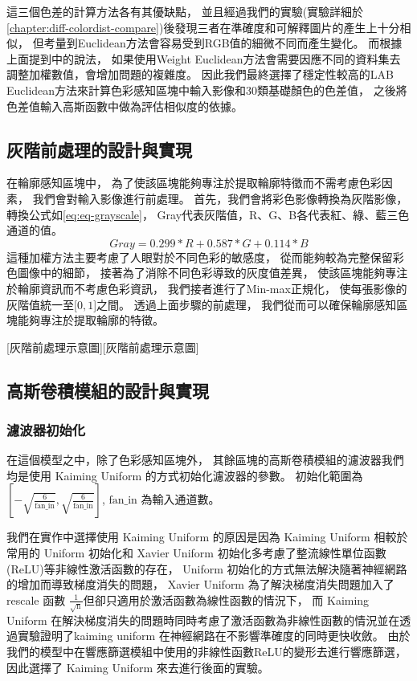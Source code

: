 \documentclass[class=NCU_thesis, crop=false]{standalone}
\begin{document}
			這三個色差的計算方法各有其優缺點，
			並且經過我們的實驗(實驗詳細於\cref{chapter:diff-colordist-compare})後發現三者在準確度和可解釋圖片的產生上十分相似，
			但考量到Euclidean方法會容易受到RGB值的細微不同而產生變化。
			而根據上面提到\cite{LABformula}中的說法，
			如果使用Weight Euclidean方法會需要因應不同的資料集去調整加權數值，會增加問題的複雜度。
			因此我們最終選擇了穩定性較高的LAB Euclidean方法來計算色彩感知區塊中輸入影像和30類基礎顏色的色差值，
			之後將色差值輸入高斯函數中做為評估相似度的依據。

	\subsection{灰階前處理的設計與實現}
		在輪廓感知區塊中，
		為了使該區塊能夠專注於提取輪廓特徵而不需考慮色彩因素，
		我們會對輸入影像進行前處理。
		首先，我們會將彩色影像轉換為灰階影像，
		轉換公式如\cref{eq:eq-grayscale}，
		Gray代表灰階值，R、G、B各代表紅、綠、藍三色通道的值。
		\begin{equation}
		    \label{eq:eq-grayscale}
		    Gray = 0.299 * R + 0.587 * G + 0.114 * B
		\end{equation}
		這種加權方法主要考慮了人眼對於不同色彩的敏感度，
		從而能夠較為完整保留彩色圖像中的細節，
		接著為了消除不同色彩導致的灰度值差異，
		使該區塊能夠專注於輪廓資訊而不考慮色彩資訊，
		我們接者進行了Min-max正規化，
		使每張影像的灰階值統一至[$0, 1$]之間。
		透過上面步驟的前處理，
		我們從而可以確保輪廓感知區塊能夠專注於提取輪廓的特徵。

		[灰階前處理示意圖][灰階前處理示意圖]

	\subsection{高斯卷積模組的設計與實現}
		\subsubsection{濾波器初始化}
			在這個模型之中，除了色彩感知區塊外，
			其餘區塊的高斯卷積模組的濾波器我們均是使用 Kaiming Uniform \cite{DBLP:journals/corr/HeZR015}的方式初始化濾波器的參數。
			初始化範圍為$[-\sqrt{\frac{6}{\text{fan\_in}}}, \sqrt{\frac{6}{\text{fan\_in}}}]$,
			$\text{fan\_in}$ 為輸入通道數。

			我們在實作中選擇使用 Kaiming Uniform 的原因是因為 Kaiming Uniform 相較於常用的 Uniform 初始化和 Xavier Uniform\cite{pmlr-v9-glorot10a} 初始化多考慮了整流線性單位函數(ReLU)等非線性激活函數的存在，
			Uniform 初始化的方式無法解決隨著神經網路的增加而導致梯度消失的問題，
			Xavier Uniform 為了解決梯度消失問題加入了 rescale 函數 $\frac{1}{\sqrt{\text{n}}}$但卻只適用於激活函數為線性函數的情況下，
			而 Kaiming Uniform 在解決梯度消失的問題時同時考慮了激活函數為非線性函數的情況並在\cite{DBLP:journals/corr/HeZR015}透過實驗證明了kaiming uniform 在神經網路在不影響準確度的同時更快收斂。
			由於我們的模型中在響應篩選模組中使用的非線性函數ReLU的變形去進行響應篩選，因此選擇了 Kaiming Uniform 來去進行後面的實驗。
\end{document}
